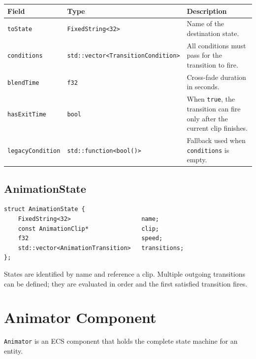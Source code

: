 \begin{longtable}{llp{7.5cm}}
\toprule
\textbf{Field}     & \textbf{Type}   & \textbf{Description} \\
\midrule
\texttt{toState}        & \texttt{FixedString<32>}                  & Name of the destination state. \\
\texttt{conditions}     & \texttt{std::vector<TransitionCondition>} & All conditions must pass for the transition to fire. \\
\texttt{blendTime}      & \texttt{f32}                              & Cross-fade duration in seconds. \\
\texttt{hasExitTime}    & \texttt{bool}                             & When \texttt{true}, the transition can fire only after the current clip finishes. \\
\texttt{legacyCondition}& \texttt{std::function<bool()>}            & Fallback used when \texttt{conditions} is empty. \\
\bottomrule
\end{longtable}

\subsection{AnimationState}

\begin{lstlisting}
struct AnimationState {
    FixedString<32>                    name;
    const AnimationClip*               clip;
    f32                                speed;
    std::vector<AnimationTransition>   transitions;
};
\end{lstlisting}

States are identified by name and reference a clip. Multiple outgoing
transitions can be defined; they are evaluated in order and the first
satisfied transition fires.

\section{Animator Component}

\texttt{Animator} is an ECS component that holds the complete state machine
for an entity.

